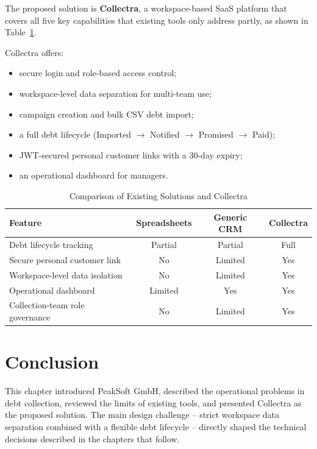 \documentclass[12pt,a4paper]{report}
\begin{document}
The proposed solution is \textbf{Collectra}, a workspace-based SaaS platform that
covers all five key capabilities that existing tools only address partly,
as shown in Table~\ref{tab:comparison}.

Collectra offers:
\begin{itemize}
  \item secure login and role-based access control;
  \item workspace-level data separation for multi-team use;
  \item campaign creation and bulk CSV debt import;
  \item a full debt lifecycle (Imported $\to$ Notified $\to$ Promised $\to$ Paid);
  \item JWT-secured personal customer links with a 30-day expiry;
  \item an operational dashboard for managers.
\end{itemize}

\begin{table}[H]
  \centering
  \renewcommand{\arraystretch}{1.30}
  \begin{tabular}{|p{4.4cm}|c|c|c|}
    \hline
    \textbf{Feature} & \textbf{Spreadsheets} & \textbf{Generic CRM} & \textbf{Collectra} \\
    \hline
    Debt lifecycle tracking          & Partial  & Partial & Full \\
    \hline
    Secure personal customer link    & No       & Limited & Yes \\
    \hline
    Workspace-level data isolation   & No       & Limited & Yes \\
    \hline
    Operational dashboard            & Limited  & Yes     & Yes \\
    \hline
    Collection-team role governance  & No       & Limited & Yes \\
    \hline
  \end{tabular}
  \caption{Comparison of Existing Solutions and Collectra}
  \label{tab:comparison}
\end{table}

\section*{Conclusion}
{}

This chapter introduced PeakSoft GmbH, described the operational problems in debt
collection, reviewed the limits of existing tools, and presented Collectra as the
proposed solution.
The main design challenge -- strict workspace data separation combined with a
flexible debt lifecycle -- directly shaped the technical decisions described in the
chapters that follow.
\end{document}
